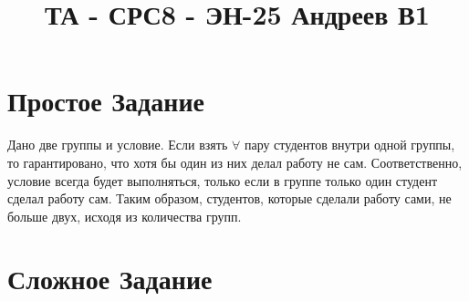 \documentclass[12pt]{article}
\title{ТА - СРС8 - ЭН-25 Андреев В1}
\author{}
\date{}
\begin{document}
\maketitle

\section*{Простое Задание}

Дано две группы и условие. 
Если взять $\forall$ пару студентов внутри одной группы, 
то гарантировано, что хотя бы один из них делал работу 
не сам. Соответственно, условие всегда будет выполняться,
только если в группе только один студент сделал работу сам.
Таким образом, студентов, которые сделали работу сами, не больше двух, 
исходя из количества групп.

\section*{Сложное Задание}
\end{document}
